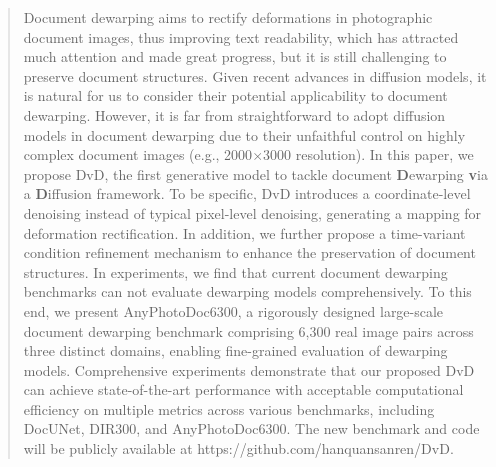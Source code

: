 \documentclass[acmtog]{acmart} %
\begin{document}
\begin{abstract}
Document dewarping aims to rectify deformations in photographic document images, thus improving text readability, which has attracted much attention and made great progress, but it is still challenging to preserve document structures. Given recent advances in diffusion models, it is natural for us to consider their potential applicability to document dewarping. However, it is far from straightforward to adopt diffusion models in document dewarping due to their unfaithful control on highly complex document images (e.g., 2000$\times$3000 resolution). 
In this paper, we propose DvD, the first generative model to tackle document \textbf{D}ewarping \textbf{v}ia a \textbf{D}iffusion framework. To be specific, DvD introduces a coordinate-level denoising instead of typical pixel-level denoising, generating a mapping for deformation rectification. In addition, we further propose a time-variant condition refinement mechanism to enhance the preservation of document structures. In experiments, we find that current document dewarping benchmarks can not evaluate dewarping models comprehensively. To this end, we present AnyPhotoDoc6300, a rigorously designed large-scale document dewarping benchmark comprising 6,300 real image pairs across three distinct domains, enabling fine-grained evaluation of dewarping models. Comprehensive experiments demonstrate that our proposed DvD can achieve state-of-the-art performance with acceptable computational efficiency on multiple metrics across various benchmarks, including DocUNet, DIR300, and AnyPhotoDoc6300. The new benchmark and code will be publicly available at https://github.com/hanquansanren/DvD. 



\end{abstract}
\end{document}
